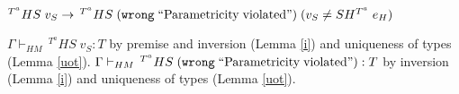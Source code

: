 \begin{case}
$^{T^{a}}HS\;v_{S}\rightarrow\,^{T^{a}}HS\;(\mathtt{wrong}\;\mathrm{``Parametricity\;violated"})\;(v_{S}\neq SH^{T^{a}}\;e_{H})$

$\Gamma\vdash_{HM}\,^{T^{a}}HS\;v_{S}:T$ by premise and inversion (Lemma \ref{i}) and uniqueness of types (Lemma \ref{uot}).  $\Gamma\vdash_{HM}\,^{T^{a}}HS\;(\mathtt{wrong}\;\mathrm{``Parametricity\;violated"}):T$ by inversion (Lemma \ref{i}) and uniqueness of types (Lemma \ref{uot}).
\end{case}